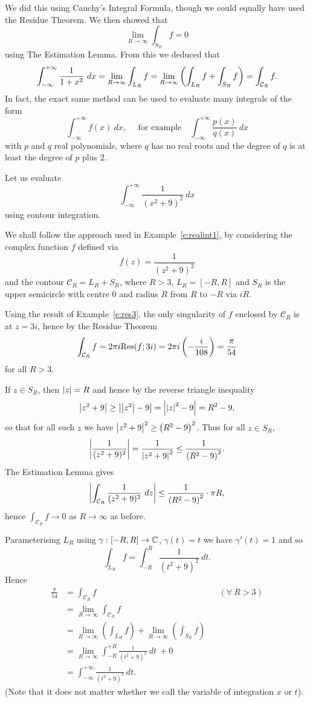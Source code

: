 We did this using Cauchy's Integral Formula, though we could equally have used the Residue Theorem.  We then showed that
\[
\lim_{R \to \infty} \int_{S_R} f = 0
\]
using The Estimation Lemma.  From this we deduced that
\[
\int_{-\infty}^{+\infty} \frac{1}{1+x^2}\ dx  = \lim_{R \to \infty} \int_{L_R} f = \lim_{R \to \infty} \left( \int_{L_R}f + \int_{S_R} f \right)
= \int_{\mathcal{C}_R} f. 
\]
In fact, the exact same method can be used to evaluate many integrals of the form
\[
\int_{-\infty}^{+\infty} f(x)\ dx,\quad\text{ for example}\quad \int_{-\infty}^{+\infty} \frac{p(x)}{q(x)}\ dx
\]
with $p$ and $q$ real polynomials, where $q$ has no real roots and the degree of $q$ is at least the degree of $p$ plus 2.
\begin{example}
\label{e:realint2}
Let us evaluate
\[
\int_{-\infty}^{+\infty} \frac{1}{(x^2+9)^2}\ dx
\]
using contour integration.
\end{example}
\begin{solution}

We shall follow the approach used in Example~\ref{e:realint1}, by considering the complex function $f$ defined via
\[
f(z) = \frac{1}{(z^2+9)^2}
\]
and the contour $\mathcal{C}_R=L_R+S_R$, where $R>3$, $L_R=[-R,R]$ and $S_R$ is the upper semicircle with centre $0$ and radius $R$ from $R$ to $-R$ via $iR$.

Using the result of Example~\ref{e:res3}, the only singularity of $f$ enclosed by $\mathcal{C}_R$ is at $z=3i$, hence by the Residue Theorem
\[
\int_{\mathcal{C}_R} f = 2\pi i \mathrm{Res} (f;3i) = 2\pi i \left( -\frac{i}{108} \right) = \frac{\pi}{54}
\]
for all $R>3$.

If $z \in S_R$, then $\left| z \right|=R$ and hence by the reverse triangle inequality
\[
\left| z^2+9 \right| \geq \left| \left| z^2 \right|-9 \right| = \left| \left| z \right|^2-9 \right| = R^2-9,
\]
so that for all such $z$ we have $\left| z^2+9 \right|^2 \geq \left( R^2-9 \right)^2$.  Thus for all $z \in S_R$,
\[
\left| \frac{1}{(z^2+9)^2} \right| = \frac{1}{\left| z^2+9 \right|^2} \leq \frac{1}{\left(R^2-9 \right)^2}.
\]
The Estimation Lemma gives
\[
\left|  \int_{\mathcal{C}_R} \frac{1}{(z^2+9)^2}\ dz  \right| \leq \frac{1}{\left(R^2-9 \right)^2} \cdot \pi R,
\]
hence $\displaystyle \int_{\mathcal{C}_R} f \to 0$ as $R \to \infty$ as before.

Parameterising $L_R$ using $\gamma:[-R,R] \to \mathbb{C}$, $\gamma(t)=t$ we have $\gamma'(t)=1$ and so
\[
\int_{L_R} f = \int_{-R}^{R} \frac{1}{(t^2+9)^2}\ dt.
\]
Hence
\begin{align*}
\frac{\pi}{54} & = \int_{\mathcal{C}_R} f  && (\forall\ R>3) \\
& = \lim_{R \to \infty} \int_{\mathcal{C}_R} f && \\
& = \lim_{R \to \infty} \left( \int_{L_R} f \right) + \lim_{R \to \infty} \left( \int_{S_R} f \right) && \\
& = \lim_{R \to \infty} \int_{-R}^{+R} \frac{1}{(t^2+9)^2}\ dt\ +0&& \\
 &= \int_{-\infty}^{+\infty} \frac{1}{(t^2+9)^2}\ dt. &&
\end{align*}
(Note that it does not matter whether we call the variable of integration $x$ or $t$).
\end{solution}
